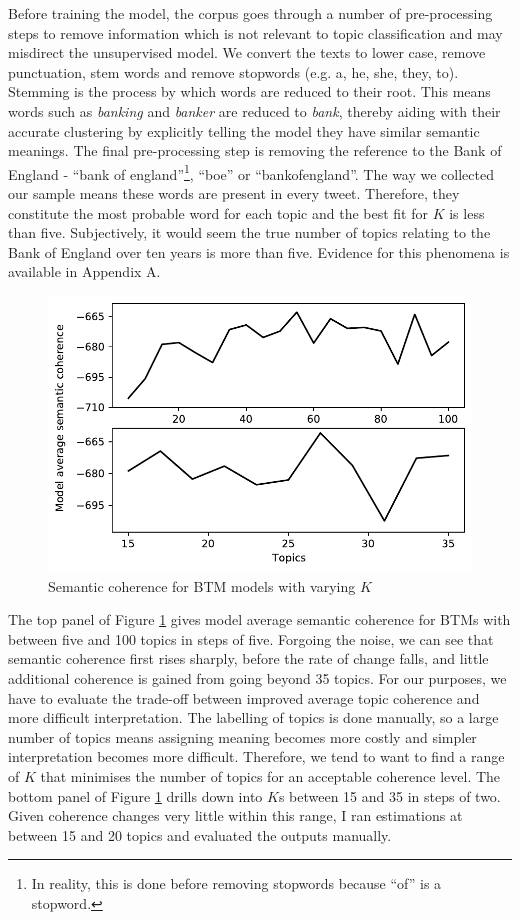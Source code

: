 \documentclass[11pt]{article}
\begin{document}
Before training the model, the corpus goes through a number of pre-processing steps to remove information which is not relevant to topic classification and may misdirect the unsupervised model. We convert the texts to lower case, remove punctuation, stem words and remove stopwords (e.g. a, he, she, they, to). Stemming is the process by which words are reduced to their root. This means words such as \emph{banking} and \emph{banker} are reduced to \emph{bank}, thereby aiding with their accurate clustering by explicitly telling the model they have similar semantic meanings. The final pre-processing step is removing the reference to the Bank of England - ``bank of england''\footnote{In reality, this is done before removing stopwords because ``of'' is a stopword.}, ``boe'' or ``bankofengland''. The way we collected our sample means these words are present in every tweet. Therefore, they constitute the most probable word for each topic and the best fit for $K$ is less than five. Subjectively, it would seem the true number of topics relating to the Bank of England over ten years is more than five. Evidence for this phenomena is available in Appendix A. 

\begin{figure}[h]
	\center
	\caption{Semantic coherence for BTM models with varying $K$} \label{fig:k search}
	\includegraphics[keepaspectratio = true]{k_search.pdf}
	\end{figure}

The top panel of Figure \ref{fig:k search} gives model average semantic coherence for BTMs with between five and 100 topics in steps of five. Forgoing the noise, we can see that semantic coherence first rises sharply, before the rate of change falls, and little additional coherence is gained from going beyond 35 topics. For our purposes, we have to evaluate the trade-off between improved average topic coherence and more difficult interpretation. The labelling of topics is done manually, so a large number of topics means assigning meaning becomes more costly and simpler interpretation becomes more difficult. Therefore, we tend to want to find a range of $K$ that minimises the number of topics for an acceptable coherence level. The bottom panel of Figure \ref{fig:k search} drills down into $K$s between 15 and 35 in steps of two. Given coherence changes very little within this range, I ran estimations at between 15 and 20 topics and evaluated the outputs manually.
\end{document}

